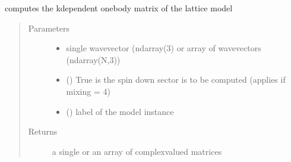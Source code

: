 \documentclass[letterpaper,10pt,english]{sphinxmanual}
\begin{document}
\begin{fulllineitems}
\label{\detokenize{functions:pyqcm.tk}}
\sphinxAtStartPar
computes the k\sphinxhyphen{}dependent one\sphinxhyphen{}body matrix of the lattice model
\begin{quote}\begin{description}
\item[{Parameters}] \leavevmode\begin{itemize}
\item {} 
\sphinxAtStartPar
{} \textendash{} single wavevector (ndarray(3) or array of wavevectors (ndarray(N,3))

\item {} 
\sphinxAtStartPar
{} () \textendash{} True is the spin down sector is to be computed (applies if mixing = 4)

\item {} 
\sphinxAtStartPar
{} () \textendash{} label of the model instance

\end{itemize}

\item[{Returns}] \leavevmode
\sphinxAtStartPar
a single or an array of complex\sphinxhyphen{}valued matrices

\end{description}\end{quote}

\end{fulllineitems}

\end{document}
